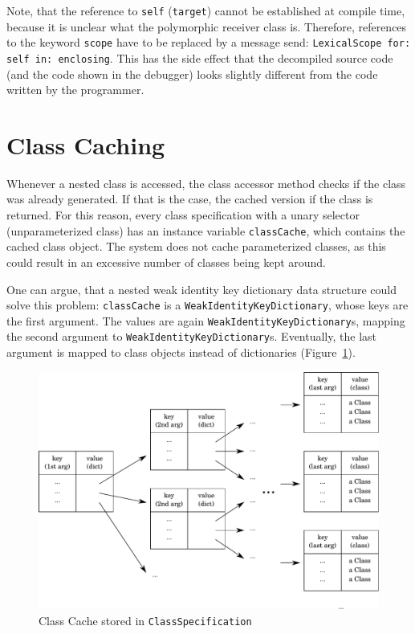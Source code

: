 Note, that the reference to \texttt{self} (\texttt{target}) cannot be established at compile time, because it is unclear what the polymorphic receiver class is. Therefore, references to the keyword \texttt{scope} have to be replaced by a message send: \texttt{LexicalScope for: self in: enclosing}. This has the side effect that the decompiled source code (and the code shown in the debugger) looks slightly different from the code written by the programmer.

\section{Class Caching}
Whenever a nested class is accessed, the class accessor method checks if the class was already generated. If that is the case, the cached version if the class is returned. For this reason, every class specification with a unary selector (unparameterized class) has an instance variable \texttt{classCache}, which contains the cached class object. The system does not cache parameterized classes, as this could result in an excessive number of classes being kept around.

One can argue, that a nested weak identity key dictionary data structure could solve this problem: \texttt{classCache} is a \texttt{WeakIdentityKeyDictionary}, whose keys are the first argument. The values are again \texttt{WeakIdentityKeyDictionary}s, mapping the second argument to \texttt{WeakIdentityKeyDictionary}s. Eventually, the last argument is mapped to class objects instead of dictionaries (Figure~\ref{fig:impl_class_cache}).
\begin{figure}[!htp]
	\includegraphics[width=\textwidth]{class_cache.pdf}
	\centering
	\caption{Class Cache stored in \texttt{ClassSpecification}}
	\label{fig:impl_class_cache}
\end{figure}

